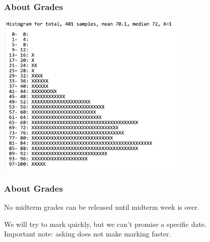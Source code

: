 \begin{frame}
\frametitle{About Grades}

\begin{center}
\includegraphics[width=0.7\textwidth]{images/2013-midterm-histogram.png}
\end{center}

\end{frame}

\begin{frame}
\frametitle{About Grades}

No midterm grades can be released until midterm week is over.

We will try to mark quickly, but we can't promise a specific date.\\
\quad\quad Important note: asking does not make marking faster.

\end{frame}




